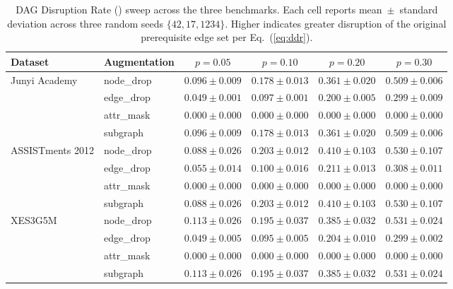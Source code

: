 \begin{table}[t]
\centering
\caption{DAG Disruption Rate (\DDR{}) sweep across the three benchmarks.
Each cell reports mean~$\pm$~standard deviation across three random
seeds $\{42, 17, 1234\}$. Higher \DDR{} indicates greater disruption of
the original prerequisite edge set per Eq.~(\ref{eq:ddr}).}
\label{tab:ddr-sweep}
\setlength{\tabcolsep}{4pt}
\renewcommand{\arraystretch}{1.05}
\begin{tabular}{llcccc}
\toprule
Dataset & Augmentation & $p=0.05$ & $p=0.10$ & $p=0.20$ & $p=0.30$ \\
\midrule
\multirow{4}{*}{Junyi Academy}
  & node\_drop  & $0.096 \pm 0.009$ & $0.178 \pm 0.013$ & $0.361 \pm 0.020$ & $0.509 \pm 0.006$ \\
  & edge\_drop  & $0.049 \pm 0.001$ & $0.097 \pm 0.001$ & $0.200 \pm 0.005$ & $0.299 \pm 0.009$ \\
  & attr\_mask  & $0.000 \pm 0.000$ & $0.000 \pm 0.000$ & $0.000 \pm 0.000$ & $0.000 \pm 0.000$ \\
  & subgraph    & $0.096 \pm 0.009$ & $0.178 \pm 0.013$ & $0.361 \pm 0.020$ & $0.509 \pm 0.006$ \\
\midrule
\multirow{4}{*}{ASSISTments 2012}
  & node\_drop  & $0.088 \pm 0.026$ & $0.203 \pm 0.012$ & $0.410 \pm 0.103$ & $0.530 \pm 0.107$ \\
  & edge\_drop  & $0.055 \pm 0.014$ & $0.100 \pm 0.016$ & $0.211 \pm 0.013$ & $0.308 \pm 0.011$ \\
  & attr\_mask  & $0.000 \pm 0.000$ & $0.000 \pm 0.000$ & $0.000 \pm 0.000$ & $0.000 \pm 0.000$ \\
  & subgraph    & $0.088 \pm 0.026$ & $0.203 \pm 0.012$ & $0.410 \pm 0.103$ & $0.530 \pm 0.107$ \\
\midrule
\multirow{4}{*}{XES3G5M}
  & node\_drop  & $0.113 \pm 0.026$ & $0.195 \pm 0.037$ & $0.385 \pm 0.032$ & $0.531 \pm 0.024$ \\
  & edge\_drop  & $0.049 \pm 0.005$ & $0.095 \pm 0.005$ & $0.204 \pm 0.010$ & $0.299 \pm 0.002$ \\
  & attr\_mask  & $0.000 \pm 0.000$ & $0.000 \pm 0.000$ & $0.000 \pm 0.000$ & $0.000 \pm 0.000$ \\
  & subgraph    & $0.113 \pm 0.026$ & $0.195 \pm 0.037$ & $0.385 \pm 0.032$ & $0.531 \pm 0.024$ \\
\bottomrule
\end{tabular}
\end{table}
